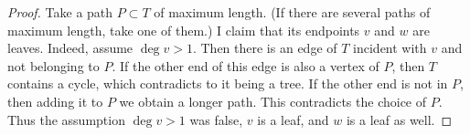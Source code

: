 

\setcounter{section}{2}
\setcounter{subsection}{2}
\setcounter{dfn}{4}

\begin{proof}
Take a path $P \subset T$ of maximum length.
(If there are several paths of maximum length, take one of them.)
I claim that its endpoints $v$ and $w$ are leaves.
Indeed, assume $\deg v > 1$.
Then there is an edge of $T$ incident with $v$ and not belonging to $P$.
If the other end of this edge is also a vertex of $P$, then $T$ contains a cycle, which contradicts to it being a tree.
If the other end is not in $P$, then adding it to $P$ we obtain a longer path.
This contradicts the choice of $P$.
Thus the assumption $\deg v > 1$ was false, $v$ is a leaf, and $w$ is a leaf as well.
\end{proof}



